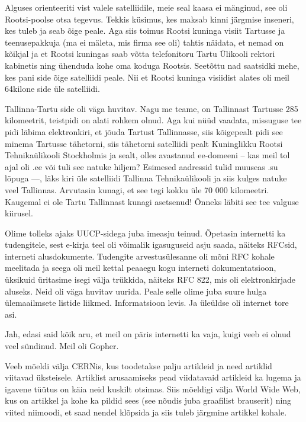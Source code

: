 Alguses orienteeriti vist valele satelliidile, meie seal kaasa ei mänginud, see 
oli Rootsi-poolse otsa tegevus. Tekkis küsimus, kes maksab kinni
järgmise inseneri, kes tuleb ja seab õige peale. Aga siis toimus
Rootsi kuninga visiit Tartusse ja teenusepakkuja (ma ei mäleta, mis firma 
see oli) tahtis näidata, et nemad on kõikjal ja et Rootsi kuningas saab võtta 
telefonitoru Tartu Ülikooli rektori kabinetis ning ühenduda kohe oma koduga 
Rootsis. Seetõttu nad saatsidki mehe, kes pani side õige satelliidi peale. 
Nii et Rootsi kuninga visiidist alates oli meil 64kilone side üle satelliidi. 

Tallinna-Tartu side oli väga huvitav. Nagu me teame, on Tallinnast Tartusse 285 kilomeetrit, teistpidi on alati rohkem olnud. Aga kui 
nüüd vaadata, missuguse tee pidi läbima elektronkiri, et jõuda Tartust 
Tallinnasse, siis kõigepealt pidi see minema Tartusse tähetorni, siis tähetorni 
satelliidi pealt Kuninglikku Rootsi Tehnikaülikooli Stockholmis ja sealt, olles 
avastanud ee-domeeni -- kas meil tol ajal oli .ee või tuli see natuke hiljem? 
Esimesed aadressid tulid muuseas .su lõpuga ---, läks kiri üle satelliidi 
Tallinna Tehnikaülikooli ja siis kulges natuke veel Tallinnas. Arvutasin kunagi, et see tegi
kokku üle 70 000 kilomeetri\label{sisu!70k}. Kaugemal ei ole Tartu 
Tallinnast kunagi asetsenud! Õnneks läbiti see tee valguse kiirusel. 


Olime tolleks ajaks UUCP-sidega juba imeasju teinud. 
Õpetasin internetti ka tudengitele, sest e-kirja teel oli 
võimalik igasuguseid asju saada, näiteks RFCsid, interneti 
alusdokumente. Tudengite 
arvestusülesanne oli mõni RFC kohale meelitada ja seega oli meil kettal 
peaaegu kogu interneti dokumentatsioon, üksikuid üritasime isegi 
välja trükkida, näiteks RFC 822, mis oli elektronkirjade aluseks. Neid oli väga huvitav uurida. Peale selle olime juba suure hulga ülemaailmsete 
listide liikmed. Informatsioon levis. Ja üleüldse oli internet tore asi. 


Jah, edasi said kõik aru, et meil on päris internetti ka vaja, kuigi 
veeb ei olnud veel sündinud. Meil oli Gopher.

Veeb mõeldi välja CERNis, kus
toodetakse palju artikleid ja need artiklid viitavad üksteisele. 
Artiklist arusaamiseks pead viidatavaid artikleid ka lugema ja 
igavene tüütus on käia neid kuskilt otsimas. Siis mõeldigi välja 
World Wide Web, kus on artikkel ja kohe ka pildid sees (see nõudis 
juba graafilist brauserit) ning viited niimoodi, et saad nendel klõpsida 
ja siis tuleb järgmine artikkel kohale. 

